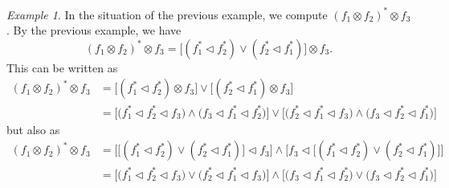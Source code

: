 \documentclass[12pt]{article}
\theoremstyle{definition}
\theoremstyle{remark}
\newtheorem{exm}{Example}
\def\vtl{\vartriangleleft}
\begin{document}
\begin{exm}\label{example:tensor3} In the situation of the previous example, we compute $(f_1\otimes
f_2)^*\otimes f_3$. By the previous example, we have
\[
(f_1\otimes
f_2)^*\otimes f_3= \bigl[(f^*_1\vtl f^*_2)\vee (f^*_2\vtl f^*_1)\bigr]\otimes f_3.
\]
This can be written as
\begin{align*}
(f_1\otimes
f_2)^*\otimes f_3&=\bigl[(f^*_1\vtl f^*_2)\otimes f_3\bigr]\vee\bigl[ (f^*_2\vtl
f^*_1)\otimes f_3\bigr]\\
&=\biggl[\bigl(f^*_1\vtl f^*_2\vtl f_3\bigl)\wedge \bigl(f_3\vtl f_1^*\vtl
f_2^*\bigr)\biggr]\vee \biggl[\bigl(f^*_2\vtl f^*_1\vtl f_3\bigl)\wedge \bigl(f_3\vtl
f_2^*\vtl f_1^*\bigr)\biggr]
\end{align*}
but also as 
\begin{align*}
(f_1\otimes
f_2)^*\otimes f_3&=\biggl[\bigl[(f^*_1\vtl f^*_2)\vee (f^*_2\vtl f^*_1)\bigr]\vtl
f_3\biggr]\wedge \biggl[f_3\vtl \bigl[(f^*_1\vtl f^*_2)\vee (f^*_2\vtl
f^*_1)\bigr]\biggr]\\
&=\biggl[\bigl(f^*_1\vtl f^*_2\vtl f_3\bigr)\vee \bigl(f^*_2\vtl f^*_1\vtl
f_3\bigr)\biggr]\wedge \biggl[\bigl(f_3\vtl f^*_1\vtl f^*_2\bigr)\vee \bigl(f_3\vtl f^*_2\vtl
f^*_1\bigr)\biggr]
\end{align*}


\end{exm}
\end{document}
